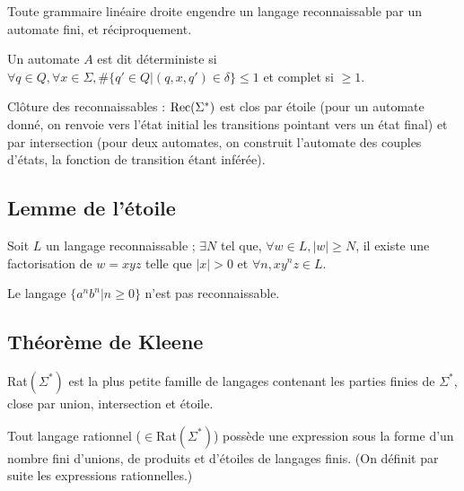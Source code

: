 \documentclass[a4paper]{article}
\begin{document}
\begin{prop}
Toute grammaire linéaire droite engendre un langage reconnaissable par un automate fini, et réciproquement.
\end{prop}

\begin{defi}
Un automate $A$ est dit déterministe si $\forall q\in Q, \forall x\in \Sigma, \#\{q'\in Q | (q, x, q') \in \delta\} \leqslant 1$ et complet si $\geqslant 1$.
\end{defi}

Clôture des reconnaissables : $\textnormal{Rec}(\Sigma^*)$ est clos par étoile (pour un automate donné, on renvoie vers l'état initial les transitions pointant vers un état final) et par intersection (pour deux automates, on construit l'automate des couples d'états, la fonction de transition étant inférée).

\subsection{Lemme de l'étoile}
\begin{lem}
Soit $L$ un langage reconnaissable ; $\exists N$ tel que, $\forall w\in L, |w|\geqslant N$, il existe une factorisation de $w=xyz$ telle que $|x|>0$ et $\forall n, xy^nz\in L$.
\end{lem}

\begin{prop}
Le langage $\{a^nb^n|n\geqslant 0\}$ n'est pas reconnaissable.
\end{prop}

\subsection{Théorème de Kleene}
\begin{defi}
Rat$(\Sigma^*)$ est la plus petite famille de langages contenant les parties finies de $\Sigma^*$, close par union, intersection et étoile.
\end{defi}

\begin{prop}
Tout langage rationnel ($\in$Rat$(\Sigma^*)$) possède une expression sous la forme d'un nombre fini d'unions, de produits et d'étoiles de langages finis. (On définit par suite les expressions rationnelles.)
\end{prop}
\end{document}
